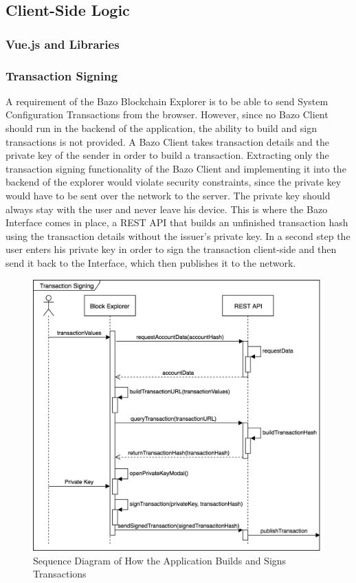 \subsection{Client-Side Logic} \label{sec:clientside}

\subsubsection{Vue.js \cite{vue} and Libraries}

\subsubsection{Transaction Signing} \label{txsigning}
A requirement of the Bazo Blockchain Explorer is to be able to send System Configuration Transactions from the browser. 
However, since no Bazo Client should run in the backend of the application, the ability to build and sign transactions is not provided. A Bazo Client takes transaction details and the private key of the sender in order to build a transaction. Extracting only the transaction signing functionality of the Bazo Client and implementing it into the backend of the explorer would violate security constraints, since the private key would have to be sent over the network to the server. The private key should always stay with the user and never leave his device. This is where the Bazo Interface \cite{marc} comes in place, a REST API that builds an unfinished transaction hash using the transaction details without the issuer's private key. In a second step the user enters his private key in order to sign the transaction client-side and then send it back to the Interface, which then publishes it to the network.

\begin{figure}
  \includegraphics[scale=0.35]{transactionbuilding.png}
  \centering
  \caption{Sequence Diagram of How the Application Builds and Signs Transactions}
  \label{fig:sequence1}
\end{figure}

